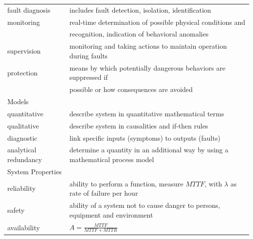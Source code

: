 \begin{table}
\begin{tabular}{@{}ll@{}}
        fault diagnosis           & includes fault detection, isolation, identification                         \\
        monitoring            & real-time determination of possible physical conditions and                          \\                & recognition, indication of behavioral anomalies                                                                                           \\
        supervision          & monitoring and taking actions to maintain operation during faults                                        \\
        protection           & means by which potentially dangerous behaviors are suppressed if                                          \\            & possible or how consequences are avoided                                       \\ \bottomrule
        Models &           \\ \midrule
        quantitative     & describe system in quantitative mathematical terms                                                                                           \\
        qualitative           & describe system in causalities and if-then rules \\
        diagnostic                & link specific inputs (symptoms) to outputs (faults)             \\
        analytical redundancy          & determine a quantity in an additional way by using a mathematical process model                                                              \\ \bottomrule
        System Properties             &                                                                           \\ \midrule
        reliability                 & ability to perform a function, measure $MTTF$, with $\lambda$ as rate of failure per hour                                                                            \\
        safety        & ability of a system not to cause danger to persons, equipment and environment                                                                      \\
        availability          & $A=\frac{MTTF}{MTTF + MTTR}$                                                                       \\ \bottomrule


\end{tabular}
\end{table}

